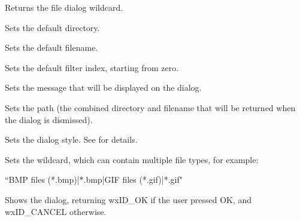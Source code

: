 Returns the file dialog wildcard.

\label{wxfiledialogsetdirectory}


Sets the default directory.

\label{wxfiledialogsetfilename}


Sets the default filename.

\label{wxfiledialogsetfilterindex}


Sets the default filter index, starting from zero.

\label{wxfiledialogsetmessage}


Sets the message that will be displayed on the dialog.

\label{wxfiledialogsetpath}


Sets the path (the combined directory and filename that will be returned when the dialog is dismissed).

\label{wxfiledialogsetstyle}


Sets the dialog style. See  for details.

\label{wxfiledialogsetwildcard}


Sets the wildcard, which can contain multiple file types, for example:

``BMP files (*.bmp)|*.bmp|GIF files (*.gif)|*.gif"

\label{wxfiledialogshowmodal}


Shows the dialog, returning wxID\_OK if the user pressed OK, and wxID\_CANCEL
otherwise.


